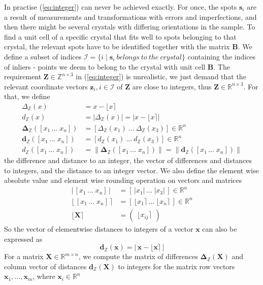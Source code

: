 \documentclass[a4paper,10pt]{article}
\newcommand{\vect}[1]{\mathbf{#1}}
\newcommand{\mat}[1]{\mathbf{#1}}
\newcommand{\round}[1]{\lfloor #1 \rceil}
\newcommand{\distZ}[1]{d_\mathbb{Z}(#1)}
\newcommand{\diffZ}[1]{\Delta_\mathbb{Z}(#1)}
\newcommand{\distvecZ}[1]{\vect{d}_\mathbb{Z}(#1)}
\newcommand{\diffvecZ}[1]{\vect{\Delta}_\mathbb{Z}(#1)}
\begin{document}
In practise (\ref{eq:integer}) can never be achieved exactly. For once, the spots $\vect{s}_i$ are a result of measurements and transformations with errors and imperfections, and then there might be several crystals with differing orientations in the sample. To find a unit cell of a specific crystal that fits well to spots belonging to that crystal, the relevant spots have to be identified together with the matrix $\mat{B}$. We define a subset of indices $\mathcal{I} = \{i \mid \vect{s}_i\ belongs\ to\ the\ crystal \}$ containing the indices of inliers - points we deem to belong to the crystal with unit cell $\mat{B}$. The requirement $\mat{Z} \in \mathbb{Z}^{n \times 3}$ in (\ref{eq:integer}) is unrealistic, we just demand that the relevant coordinate vectors $\vect{z}_i, i \in \mathcal{I}$ of $\mat{Z}$ are close to integers, thus $\mat{Z} \in \mathbb{R}^{n \times 3}$. For that, we define
%
\[
 \begin{split}
  \diffZ{x} &= x - \round{x}\\
  \distZ{x} &= |\diffZ{x}| = |x - \round{x}|\\
  \diffvecZ{[x_1\, ...\; x_n]} &= [\diffZ{x_1}\ ...\ \diffZ{x_3}] \in \mathbb{R}^n\\
  \distvecZ{[x_1\, ...\; x_n]} &= [\distZ{x_1}\ ...\ \distZ{x_3}] \in \mathbb{R}^n\\
  \distZ{[x_1\, ...\; x_n]} &= \|\diffvecZ{[x_1\, ...\; x_n]}\| = \|\distvecZ{[x_1\, ...\; x_n]}\|
 \end{split}
\]
%
the difference and distance to an integer, the vector of differences and distances to integers, and the distance to an integer vector. We also define the element wise absolute value and element wise rounding operation on vectors and matrices
%
\[
 \begin{split}
  |\,[x_1\, ...\; x_n]\,| &= [\,|x_1|\, ...\; |x_3|\,] \in \mathbb{R}^n \\
  \round{\,[x_1\, ...\; x_n]\,} &= [\,\round{x_1}\, ...\; \round{x_n}\,] \in \mathbb{R}^n \\
  \round{\mat{X}} &= \begin{pmatrix} \round{x_{ij}} \end{pmatrix}
 \end{split}
\]
%
So the vector of elementwise distances to integers of a vector $\vect{x}$ can also be expressed as
%
\[
  \distvecZ{\vect{x}} = |\, \vect{x} - \round{\vect{x}}\,|
\]
%
For a matrix $\mat{X}\in \mathbb{R}^{m\times n}$, we compute the matrix of differences $\diffvecZ{\mat{X}}$ and column vector of distances $\distvecZ{\mat{X}}$ to integers for the matrix row vectors $\vect{x}_1,\hdots ,\vect{x}_m$, where $\vect{x}_i\in \mathbb{R}^n$
\end{document}
